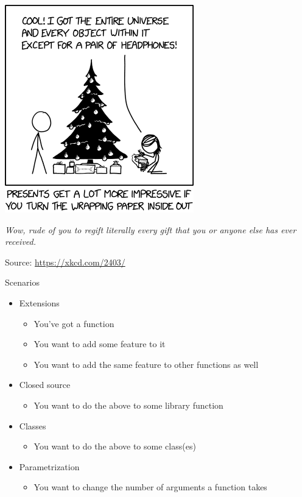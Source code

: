 
\begin{frame}
%
\begin{center}
	\includegraphics[width=.35\linewidth]{./gfx/xkcd-wrappingPaper}
	
	\emph{Wow, rude of you to regift literally every gift that you or anyone else has ever received.}

	\vspace{6pt}
	Source: \url{https://xkcd.com/2403/}
\end{center}
%
\end{frame}


\begin{frame}{Scenarios}
%
\begin{itemize}
\item Extensions
	\begin{itemize}
	\item You've got a function
	\item You want to add some feature to it
	\item You want to add the same feature to other functions as well
	\end{itemize}
\item Closed source
	\begin{itemize}
	\item You want to do the above to some library function
	\end{itemize}
\item Classes
	\begin{itemize}
	\item You want to do the above to some class(es)
	\end{itemize}
\item Parametrization
	\begin{itemize}
	\item You want to change the number of arguments a function takes
	\end{itemize}
\end{itemize}
%
\end{frame}

